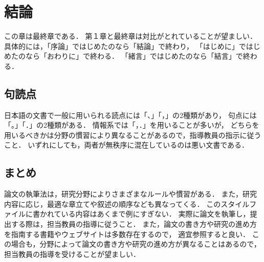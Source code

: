 \chapter{結論}	%

この章は最終章である．
第１章と最終章は対比がとれていることが望ましい．
具体的には，「序論」ではじめたのなら「結論」で終わり，
「はじめに」ではじめたのなら「おわりに」で終わる．
「緒言」ではじめたのなら「結言」で終わる．

\section{句読点}
日本語の文書で一般に用いられる読点には「、」「，」の2種類があり，
句点には「。」「．」の2種類がある．
情報系では「，．」を用いることが多いが，
どちらを用いるべきかは分野の慣習により異なることがあるので，指導教員の指示に従うこと．
いずれにしても，両者が無秩序に混在しているのは悪い文書である．

\section{まとめ}
論文の執筆法は，研究分野によりさまざまなルールや慣習がある．
また，研究内容に応じ，最適な章立てや叙述の順序なども異なってくる．
このスタイルファイルに書かれている内容はあくまで例にすぎない．
実際に論文を執筆し，提出する際は，担当教員の指導に従うこと．
また，論文の書き方や研究の進め方を指南する書籍やウェブサイトは多数存在するので，
適宜参照すると良い．
この場合も，分野によって論文の書き方や研究の進め方が異なることはあるので，
担当教員の指導を受けることが望ましい．
